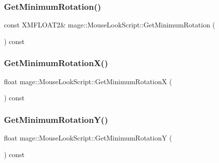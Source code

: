 \subsubsection{\texorpdfstring{Get\+Minimum\+Rotation()}{GetMinimumRotation()}}
{\footnotesize\ttfamily const X\+M\+F\+L\+O\+A\+T2\& mage\+::\+Mouse\+Look\+Script\+::\+Get\+Minimum\+Rotation (\begin{DoxyParamCaption}{ }\end{DoxyParamCaption}) const\hspace{0.3cm}{\ttfamily [noexcept]}}

\hypertarget{classmage_1_1_mouse_look_script_a1961b562ee19c7575f3005a0b1c9bc07}{}\label{classmage_1_1_mouse_look_script_a1961b562ee19c7575f3005a0b1c9bc07} 
\subsubsection{\texorpdfstring{Get\+Minimum\+Rotation\+X()}{GetMinimumRotationX()}}
{\footnotesize\ttfamily float mage\+::\+Mouse\+Look\+Script\+::\+Get\+Minimum\+RotationX (\begin{DoxyParamCaption}{ }\end{DoxyParamCaption}) const\hspace{0.3cm}{\ttfamily [noexcept]}}

\hypertarget{classmage_1_1_mouse_look_script_a4c2274d715404591ec3e4ae4ba7fb3e3}{}\label{classmage_1_1_mouse_look_script_a4c2274d715404591ec3e4ae4ba7fb3e3} 
\subsubsection{\texorpdfstring{Get\+Minimum\+Rotation\+Y()}{GetMinimumRotationY()}}
{\footnotesize\ttfamily float mage\+::\+Mouse\+Look\+Script\+::\+Get\+Minimum\+RotationY (\begin{DoxyParamCaption}{ }\end{DoxyParamCaption}) const\hspace{0.3cm}{\ttfamily [noexcept]}}

\hypertarget{classmage_1_1_mouse_look_script_afe564764c233eab0f1183e4d4096c037}{}\label{classmage_1_1_mouse_look_script_afe564764c233eab0f1183e4d4096c037} 
